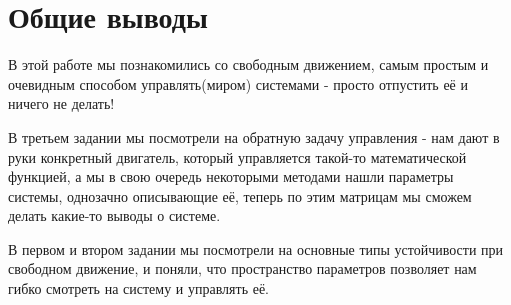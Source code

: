 \chapter{Общие выводы}
\label{ch:chap4}
В этой работе мы познакомились со свободным движением, самым простым и очевидным способом управлять(миром) системами - просто отпустить её и ничего не делать!

В третьем задании мы посмотрели на обратную задачу управления - нам дают в руки конкретный двигатель, который управляется такой-то математической функцией, а мы в свою очередь некоторыми методами нашли параметры системы, однозачно описывающие её, теперь по этим матрицам мы сможем делать какие-то выводы о системе.

В первом и втором задании мы посмотрели на основные типы устойчивости при свободном движение, и поняли, что пространство параметров позволяет нам гибко смотреть на систему и управлять её.
\endinput